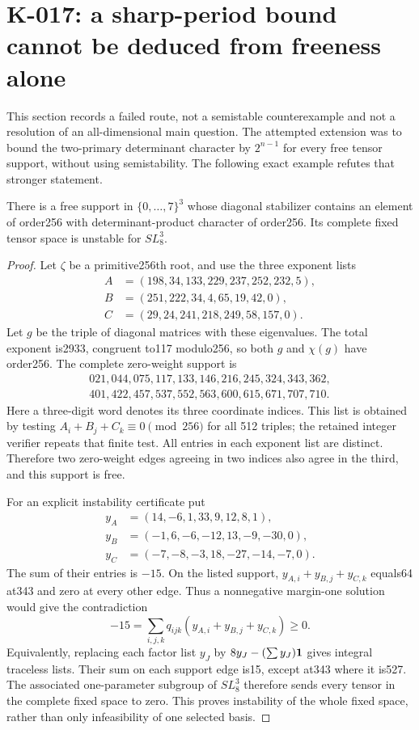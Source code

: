 \section{K-017: a sharp-period bound cannot be deduced from freeness alone}

This section records a failed route, not a semistable counterexample and
not a resolution of an all-dimensional main question.  The attempted
extension was to bound the two-primary determinant character by
$2^{n-1}$ for every free tensor support, without using semistability.
The following exact example refutes that stronger statement.

\begin{proposition}[K-017]
There is a free support in $\{0,\ldots,7\}^3$ whose diagonal
stabilizer contains an element of order256 with determinant-product
character of order256.  Its complete fixed tensor space is unstable
for $SL_8^3$.
\end{proposition}

\begin{proof}
Let $\zeta$ be a primitive256th root, and use the three exponent lists
\[
\begin{aligned}
A&=(198,34,133,229,237,252,232,5),\\
B&=(251,222,34,4,65,19,42,0),\\
C&=(29,24,241,218,249,58,157,0).
\end{aligned}
\]
Let $g$ be the triple of diagonal matrices with these eigenvalues.
The total exponent is2933, congruent to117 modulo256, so both
$g$ and $\chi(g)$ have order256.  The complete zero-weight support is
\[
\begin{gathered}
021,044,075,117,133,146,216,245,324,343,362,\\
401,422,457,537,552,563,600,615,671,707,710.
\end{gathered}
\]
Here a three-digit word denotes its three coordinate indices.  This
list is obtained by testing $A_i+B_j+C_k\equiv0\pmod{256}$ for all
512 triples; the retained integer verifier repeats that finite test.
All entries in each exponent list are distinct.  Therefore two
zero-weight edges agreeing in two indices also agree in the third,
and this support is free.

For an explicit instability certificate put
\[
\begin{aligned}
y_A&=(14,-6,1,33,9,12,8,1),\\
y_B&=(-1,6,-6,-12,13,-9,-30,0),\\
y_C&=(-7,-8,-3,18,-27,-14,-7,0).
\end{aligned}
\]
The sum of their entries is $-15$.  On the listed support,
$y_{A,i}+y_{B,j}+y_{C,k}$ equals64 at343 and zero at every other
edge.  Thus a nonnegative margin-one solution would give the
contradiction
\[
  -15=\sum_{i,j,k}q_{ijk}(y_{A,i}+y_{B,j}+y_{C,k})\ge0.
\]
Equivalently, replacing each factor list $y_J$ by
$8y_J-(\sum y_J){\bf1}$ gives integral traceless lists.  Their
sum on each support edge is15, except at343 where it is527.
The associated one-parameter subgroup of $SL_8^3$ therefore sends
every tensor in the complete fixed space to zero.  This proves
instability of the whole fixed space, rather than only infeasibility
of one selected basis.
\end{proof}

